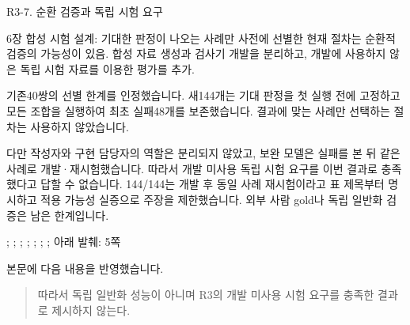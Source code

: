 \begin{reviewitem}{R3-7. 순환 검증과 독립 시험 요구}

\begin{reviewercomment}

6장 합성 시험 설계: 기대한 판정이 나오는 사례만 사전에 선별한 현재 절차는 순환적 검증의 가능성이 있음. 합성 자료 생성과 검사기 개발을 분리하고, 개발에 사용하지 않은 독립 시험 자료를 이용한 평가를 추가.

\end{reviewercomment}

\begin{authorresponse}

기존40쌍의 선별 한계를 인정했습니다. 새144개는 기대 판정을 첫 실행 전에 고정하고 모든 조합을 실행하여 최초 실패48개를 보존했습니다. 결과에 맞는 사례만 선택하는 절차는 사용하지 않았습니다.

다만 작성자와 구현 담당자의 역할은 분리되지 않았고, 보완 모델은 실패를 본 뒤 같은 사례로 개발·재시험했습니다. 따라서 개발 미사용 독립 시험 요구를 이번 결과로 충족했다고 답할 수 없습니다. 144/144는 개발 후 동일 사례 재시험이라고 표 제목부터 명시하고 적용 가능성 실증으로 주장을 제한했습니다. 외부 사람 gold나 독립 일반화 검증은 남은 한계입니다.

\end{authorresponse}

\begin{manuscriptrevision}{; ; ; ; ; ; ; 아래 발췌: 5쪽}

본문에 다음 내용을 반영했습니다.

\begin{quote}

따라서 독립 일반화 성능이 아니며 R3의 개발 미사용 시험 요구를 충족한 결과로 제시하지 않는다.

\end{quote}

\end{manuscriptrevision}

\end{reviewitem}

\clearpage

